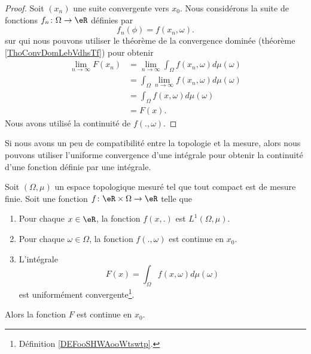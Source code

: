 \begin{proof}
    Soit \( (x_n)\) une suite convergente vers \( x_0\). Nous considérons la suite de fonctions \( f_n\colon \Omega\to \eR\) définies par
    \begin{equation}
        f_n(\phi)=f(x_n,\omega).
    \end{equation}
    sur qui nous pouvons utiliser le théorème de la convergence dominée (théorème \ref{ThoConvDomLebVdhsTf}) pour obtenir
    \begin{subequations}
        \begin{align}
            \lim_{n\to \infty} F(x_n)&=\lim_{n\to \infty} \int_{\Omega}f(x_n,\omega)d\mu(\omega)\\
            &=\int_{\Omega}\lim_{n\to \infty} f(x_n,\omega)d\mu(\omega)\\
            &=\int_{\Omega}f(x,\omega)d\mu(\omega)\\
            &=F(x).
        \end{align}
    \end{subequations}
    Nous avons utilisé la continuité de \( f(.,\omega)\).
\end{proof}


Si nous avons un peu de compatibilité entre la topologie et la mesure, alors nous pouvons utiliser l'uniforme convergence d'une intégrale pour obtenir la continuité d'une fonction définie par une intégrale.

\begin{theorem} \label{ThotexmgE}
    Soit \( (\Omega,\mu)\) un espace topologique mesuré tel que tout compact est de mesure finie. Soit une fonction \( f\colon \eR\times \Omega\to \eR\) telle que
    \begin{enumerate}
        \item
            Pour chaque \( x\in \eR\), la fonction \( f(x,.)\) est \( L^1(\Omega,\mu)\).
        \item
            Pour chaque \( \omega\in \Omega\), la fonction \( f(.,\omega)\) est continue en \( x_0\).
        \item
            L'intégrale
            \begin{equation}
                F(x)=\int_{\Omega}f(x,\omega)d\mu(\omega)
            \end{equation}
            est uniformément convergente\footnote{Définition \ref{DEFooSHWAooWtswtp}.}.
    \end{enumerate}
    Alors la fonction \( F\) est continue en \( x_0\).
\end{theorem}

